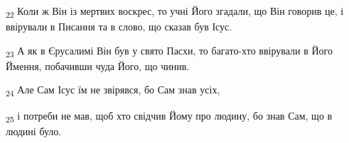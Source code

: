 \begin{tcolorbox}
\textsubscript{22} Коли ж Він із мертвих воскрес, то учні Його згадали, що Він говорив це, і ввірували в Писання та в слово, що сказав був Ісус.
\end{tcolorbox}
\begin{tcolorbox}
\textsubscript{23} А як в Єрусалимі Він був у свято Пасхи, то багато-хто ввірували в Його Ймення, побачивши чуда Його, що чинив.
\end{tcolorbox}
\begin{tcolorbox}
\textsubscript{24} Але Сам Ісус їм не звірявся, бо Сам знав усіх,
\end{tcolorbox}
\begin{tcolorbox}
\textsubscript{25} і потреби не мав, щоб хто свідчив Йому про людину, бо знав Сам, що в людині було.
\end{tcolorbox}
